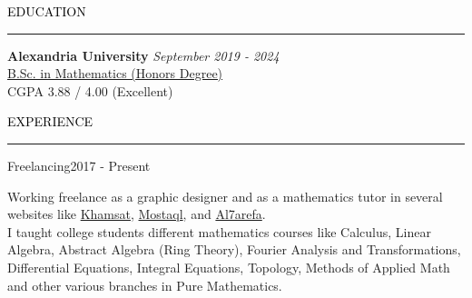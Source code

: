 \documentclass{resume} %
\renewenvironment{rSection}[1]{
\sectionskip
\textcolor{black}{\MakeUppercase{#1}}
\sectionlineskip
\hrule
\begin{list}{}{
\setlength{\leftmargin}{1.5em}
}
\item[]
}{
\end{list}
}
\begin{document}

\begin{rSection}{Education}


{\bf Alexandria University} \hfill {\em September 2019 - 2024} 
\\ \href{https://drive.google.com/file/d/1F50DDXvgqMtAoCs6Qjr5yMD2jWmPWW3m/view?usp=sharing}{\color{blue}B.Sc. in Mathematics (Honors Degree)} \hfill
\\ CGPA 3.88 / 4.00 (Excellent) \hfill
 




\end{rSection}



\begin{rSection}{Experience}
\begin{rSubsection}{Freelancing}{2017 - Present}{}{}
\item Working freelance as a graphic designer and as a mathematics tutor in several websites like \href{https://khamsat.com/user/hazem_hosam}{\color{blue}Khamsat}, \href{https://mostaql.com/u/Hazem_Hosam}{\color{blue}Mostaql}, 
 and \href{https://www.elharefa.com/en/freelancers/p/hazemhossam}{\color{blue}Al7arefa}.\\
 I taught college students different mathematics courses like Calculus, Linear Algebra, Abstract Algebra (Ring Theory), Fourier Analysis and Transformations, Differential Equations, Integral Equations, Topology, Methods of Applied Math and  other various branches in Pure Mathematics.
\end{rSubsection}
\end{rSection}
\end{document}
